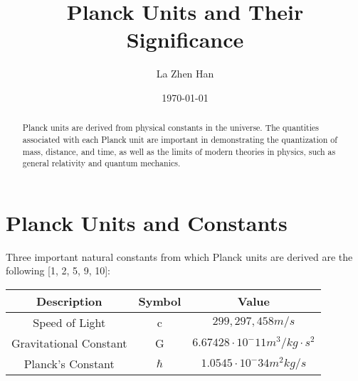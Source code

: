 \documentclass[paper=a4, fontsize=12pt]{scrartcl} %
\numberwithin{equation}{section} %
\numberwithin{figure}{section} %
\numberwithin{table}{section} %
\begin{document}

\title{
{Planck Units and Their Significance} \\ %
}
\author{La Zhen Han} %
\date{\normalsize\today} %

\maketitle %


\begin{abstract}
Planck units are derived from physical constants in the universe. The quantities associated with each Planck unit are important in demonstrating the quantization of mass, distance, and time, as well as the limits of modern theories in physics, such as general relativity and quantum mechanics.
\end{abstract}


\onehalfspacing %
\section{Planck Units and Constants}%

Three important natural constants from which Planck units are derived are the following [1, 2, 5, 9, 10]:
\vspace{0.5cm}
\begin{center}
\begin{tabular}{ccc}%
    \hline
    Description & Symbol & Value            \\ \hline
    Speed of Light   &    c               & $299,297,458m/s$                    \\
    Gravitational Constant    &   G       & $6.67428 \cdot 10^-11 m^3/kg \cdot s^2$                \\
    Planck's Constant      & $\hbar$     & $1.0545 \cdot 10^-34 m^2kg/s$ \\
 \end{tabular}
 \end{center}
\end{document}
